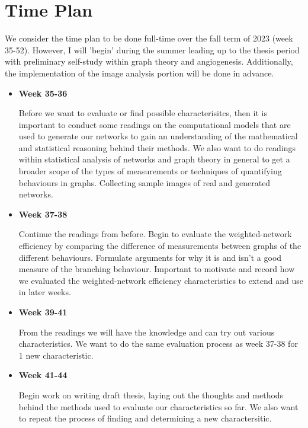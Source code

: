 \documentclass{article}
\begin{document}
\section{Time Plan}

We consider the time plan to be done full-time over the fall term of 2023
(week 35-52). However, I will 'begin' during the summer leading up to the thesis
period with preliminary self-study within graph theory and angiogenesis.
Additionally, the implementation of the image analysis portion will be done
in advance.

\begin{itemize}
    \item \textbf{Week 35-36}

        Before we want to evaluate or find possible characterisitcs, then it is
        important to conduct some readings on the computational models
        that are used to generate our networks to gain an understanding of the
        mathematical and statistical reasoning behind their methods. We also
        want to do readings within statistical analysis of networks and
        graph theory in general to get a broader scope of the types of
        measurements or techniques of quantifying behaviours in graphs.
        Collecting sample images of real and generated networks.

    \item \textbf{Week 37-38}

        Continue the readings from before. Begin to evaluate the
        weighted-network efficiency by comparing the difference of
        measurements between graphs of the different behaviours.
        Formulate arguments for why it is and isn't a good measure of
        the branching behaviour. Important to motivate and record
        how we evaluated the weighted-network efficiency characteristics
        to extend and use in later weeks.

    \item \textbf{Week 39-41}

        From the readings we will have the knowledge and can try out
        various characteristics. We want to do the same evaluation process
        as week 37-38 for 1 new characteristic.

    \item \textbf{Week 41-44}

        Begin work on writing draft thesis, laying out the thoughts and methods
        behind the methods used to evaluate our characteristics so far.
        We also want to repeat the process of finding and determining a new
        charactersitic.


\end{itemize}
\end{document}
